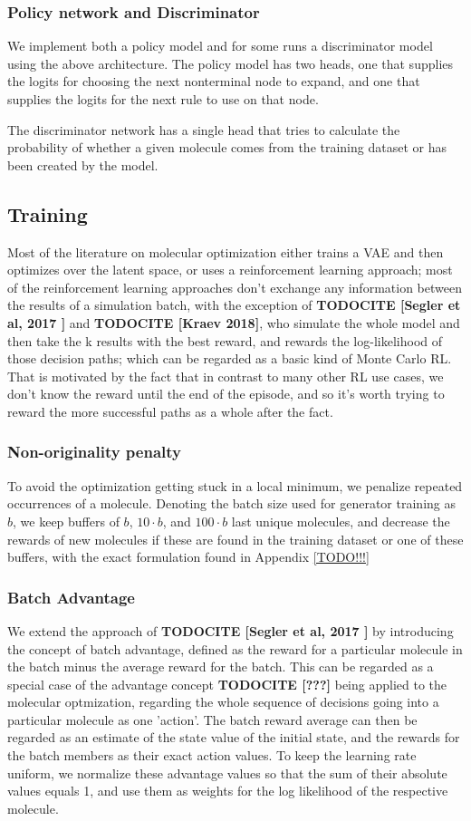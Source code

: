 \documentclass{article}
\newcommand{\CITE}[1]{{\bf TODOCITE [#1]}}
\begin{document}
\subsubsection{Policy network and Discriminator}
We implement both a policy model and for some runs a discriminator model using the above architecture. The policy model has two heads, one that supplies the logits for choosing the next nonterminal node to expand, and one that supplies the logits for the next rule to use on that node.

The discriminator network has a single head that tries to calculate the probability of whether a given molecule comes from the training dataset or has been created by the model.

\subsection{Training}\label{sec:training}
Most of the literature on molecular optimization either trains a VAE and then optimizes over the latent space, or uses a reinforcement learning approach; most of the reinforcement learning approaches don't exchange any information between the results of a simulation batch, with the exception of \CITE{Segler et al, 2017 } and \CITE{Kraev 2018}, who simulate the whole model and then take the k results with the best reward, and rewards the log-likelihood of those decision paths; which can be regarded as a basic kind of Monte Carlo RL. That is motivated by the fact that in contrast to many other RL use cases, we don't know the reward until the end of the episode, and so it's worth trying to reward the more successful paths as a whole after the fact.
\subsubsection{Non-originality penalty}
To avoid the optimization getting stuck in a local minimum, we penalize repeated occurrences of a molecule. Denoting the batch size used for generator training as $b$, we keep buffers of $b$, $10\cdot b$, and $100\cdot b$ last unique molecules, and decrease the rewards of new molecules if these are found in the training dataset or one of these buffers, with the exact formulation found in Appendix \ref{TODO!!!}
\subsubsection{Batch Advantage}
We extend the approach of \CITE{Segler et al, 2017 } by introducing the concept of batch advantage, defined as the reward for a particular molecule in the batch minus the average reward for the batch. This can be regarded as a special case of the advantage concept \CITE{???} being applied to the molecular optmization, regarding the whole sequence of decisions going into a particular molecule as one 'action'. The batch reward average can then be regarded as an estimate of the state value of the initial state, and the rewards for the batch members as their exact action values. To keep the learning rate uniform, we normalize these advantage values so that the sum of their absolute values equals 1, and use them as weights for the log likelihood of the respective molecule.
\end{document}
